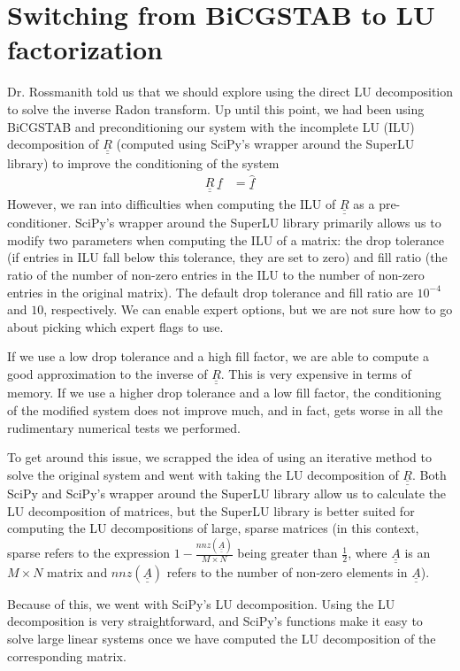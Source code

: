 \documentclass[12pt]{article}
\newcommand{\bunderline}[1]{\underline{#1}}
\renewcommand{\vec}[1]{{\bunderline{#1}}}
\newcommand{\mat}[1]{{\bunderline{\bunderline{#1}}}}
\begin{document}
\section*{Switching from BiCGSTAB to LU factorization}
Dr. Rossmanith told us that we should explore using the direct LU decomposition to solve the inverse Radon transform.
Up until this point, we had been using BiCGSTAB and preconditioning our system with the incomplete LU (ILU) decomposition of $\mat{R}$ (computed using SciPy's wrapper around the SuperLU library) to improve the conditioning of the system
\begin{align*}
	\mat{R} \, \vec{f} & = \vec{\hat{f}}
\end{align*}
However, we ran into difficulties when computing the ILU of $\mat{R}$ as a pre-conditioner.
SciPy's wrapper around the SuperLU library primarily allows us to modify two parameters when computing the ILU of a matrix: the drop tolerance (if entries in ILU fall below this tolerance, they are set to zero) and fill ratio (the ratio of the number of non-zero entries in the ILU to the number of non-zero entries in the original matrix).
The default drop tolerance and fill ratio are $10^{-4}$ and $10$, respectively.
We can enable expert options, but we are not sure how to go about picking which expert flags to use.
\par 
If we use a low drop tolerance and a high fill factor, we are able to compute a good approximation to the inverse of $\mat{R}$. 
This is very expensive in terms of memory.
If we use a higher drop tolerance and a low fill factor, the conditioning of the modified system does not improve much, and in fact, gets worse in all the rudimentary numerical tests we performed.
\par 
To get around this issue, we scrapped the idea of using an iterative method to solve the original system and went with taking the LU decomposition of $\mat{R}$.
Both SciPy and SciPy's wrapper around the SuperLU library allow us to calculate the LU decomposition of matrices, but the SuperLU library is better suited for computing the LU decompositions of large, sparse matrices (in this context, sparse refers to the expression $1 - \frac{nnz(\mat{A})}{M \times N}$ being greater than $\frac{1}{2}$, where $\mat{A}$ is an $M \times N$ matrix and $nnz(\mat{A})$ refers to the number of non-zero elements in $\mat{A}$).
\par
Because of this, we went with SciPy's LU decomposition.
Using the LU decomposition is very straightforward, and SciPy's functions make it easy to solve large linear systems once we have computed the LU decomposition of the corresponding matrix.
\end{document}

